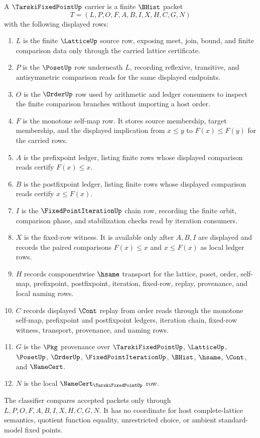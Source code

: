 \begin{definition}
\label{def:tarski-fixed-point-carrier}
A $\TarskiFixedPointUp$ carrier is a finite $\BHist$ packet
$$
T=(L,P,O,F,A,B,I,X,H,C,G,N)
$$
with the following displayed rows:
\begin{enumerate}
\item $L$ is the finite $\LatticeUp$ source row, exposing meet, join, bound, and finite comparison data only through the carried lattice certificate.
\item $P$ is the $\PosetUp$ row underneath $L$, recording reflexive, transitive, and antisymmetric comparison reads for the same displayed endpoints.
\item $O$ is the $\OrderUp$ row used by arithmetic and ledger consumers to inspect the finite comparison branches without importing a host order.
\item $F$ is the monotone self-map row. It stores source membership, target membership, and the displayed implication from $x \leq y$ to $F(x) \leq F(y)$ for the carried rows.
\item $A$ is the prefixpoint ledger, listing finite rows whose displayed comparison reads certify $F(x) \leq x$.
\item $B$ is the postfixpoint ledger, listing finite rows whose displayed comparison reads certify $x \leq F(x)$.
\item $I$ is the $\FixedPointIterationUp$ chain row, recording the finite orbit, comparison phase, and stabilization checks read by iteration consumers.
\item $X$ is the fixed-row witness. It is available only after $A,B,I$ are displayed and records the paired comparisons $F(x) \leq x$ and $x \leq F(x)$ as local ledger rows.
\item $H$ records componentwise $\hsame$ transport for the lattice, poset, order, self-map, prefixpoint, postfixpoint, iteration, fixed-row, replay, provenance, and local naming rows.
\item $C$ records displayed $\Cont$ replay from order reads through the monotone self-map, prefixpoint and postfixpoint ledgers, iteration chain, fixed-row witness, transport, provenance, and naming rows.
\item $G$ is the $\Pkg$ provenance over $\TarskiFixedPointUp$, $\LatticeUp$, $\PosetUp$, $\OrderUp$, $\FixedPointIterationUp$, $\BHist$, $\hsame$, $\Cont$, and $\NameCert$.
\item $N$ is the local $\NameCert_{\TarskiFixedPointUp}$ row.
\end{enumerate}
The classifier compares accepted packets only through $L,P,O,F,A,B,I,X,H,C,G,N$. It has no coordinate for host complete-lattice semantics, quotient function equality, unrestricted choice, or ambient standard-model fixed points.
\end{definition}


